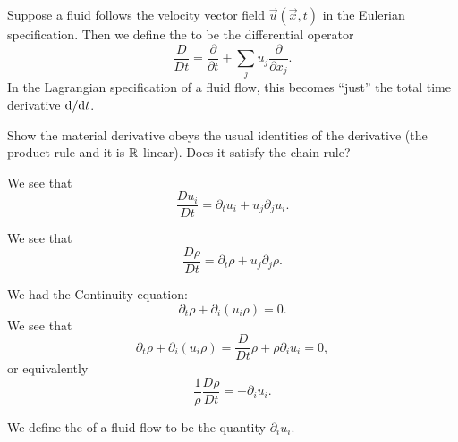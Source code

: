 \begin{definition}
Suppose a fluid follows the velocity vector field $\vec{u}(\vec{x},t)$
in the Eulerian specification. Then we define the 
to be the differential operator
\begin{equation}
\frac{D}{D t}=\frac{\partial}{\partial t}+\sum_{j}u_{j}\frac{\partial}{\partial x_{j}}.
\end{equation}
In the Lagrangian specification of a fluid flow, this becomes ``just''
the total time derivative $\mathrm{d}/\mathrm{d} t$.
\end{definition}

\begin{xca}
Show the material derivative obeys the usual identities of the
derivative (the product rule and it is $\mathbb{R}$-linear). Does it satisfy
the chain rule?
\end{xca}

\begin{example}
We see that
\begin{equation*}
\frac{D u_{i}}{D t}=\partial_{t}u_{i}+u_{j}\partial_{j}u_{i}.
\end{equation*}
\end{example}

\begin{example}
We see that
\begin{equation*}
\frac{D\rho}{D t}=\partial_{t}\rho + u_{j}\partial_{j}\rho.
\end{equation*}
\end{example}

\begin{node}
We had the Continuity equation:
\begin{equation}
\partial_{t}\rho+\partial_{i}(u_{i}\rho)=0.
\end{equation}
We see that 
\begin{equation}
\partial_{t}\rho+\partial_{i}(u_{i}\rho)=\frac{D}{D t}\rho+\rho\partial_{i}u_{i}=0,
\end{equation}
or equivalently
\begin{equation}
\frac{1}{\rho}\frac{D\rho}{D t}=-\partial_{i}u_{i}.
\end{equation}
\end{node}

\begin{definition}
We define the  of a fluid flow to be the quantity
$\partial_{i}u_{i}$. 
\end{definition}

